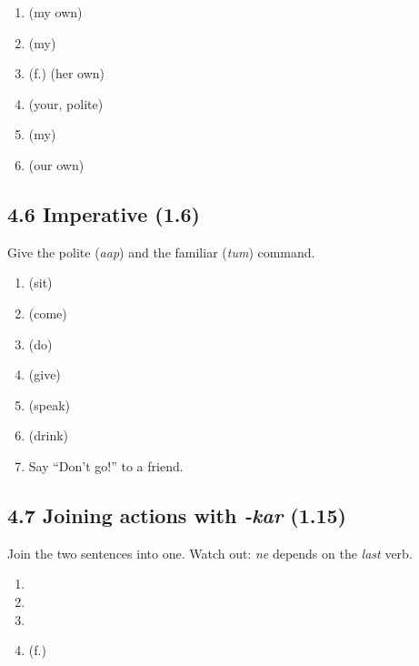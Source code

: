 \begin{enumerate}
  \item {} \hfill (my own)
  \item {} \hfill (my)
  \item {} (f.)  \hfill (her own)
  \item {} \hfill (your, polite)
  \item {} \hfill (my)
  \item {} \hfill (our own)
\end{enumerate}

\subsection{4.6 Imperative (1.6)}

Give the polite (\textit{aap}) and the familiar (\textit{tum}) command.

\begin{enumerate}
  \item {} (sit)
  \item {} (come)
  \item {} (do)
  \item {} (give)
  \item {} (speak)
  \item {} (drink)
  \item Say ``Don't go!'' to a friend.
\end{enumerate}

\subsection{4.7 Joining actions with \textit{-kar} (1.15)}

Join the two sentences into one. Watch out: \textit{ne} depends on the \emph{last} verb.

\begin{enumerate}
  \item {}
  \item {}
  \item {}
  \item {} (f.) 
\end{enumerate}

